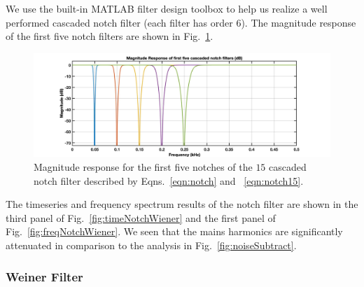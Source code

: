 \documentclass[paper-main.tex]{subfiles}
\begin{document}
We use the built-in MATLAB filter design toolbox to help us realize a well performed cascaded notch filter (each filter has order 6).  
The magnitude response of the first five notch filters are shown in Fig.~\ref{fig:notchMagResponse}. 
\begin{figure}
\begin{center}
\includegraphics[width=.49\textwidth]{figures/1111}
\end{center}
\caption{\label{fig:notchMagResponse}
Magnitude response for the first five notches of the $15$ cascaded notch filter described by Eqns.~\ref{eqn:notch} and ~\ref{eqn:notch15}. 
}
\end{figure}


The timeseries and frequency spectrum results of the notch filter are shown in the third panel of Fig.~\ref{fig:timeNotchWiener} and the first panel of Fig.~\ref{fig:freqNotchWiener}. 
We seen that the mains harmonics are significantly attenuated in comparison to the analysis in Fig.~\ref{fig:noiseSubtract}. 




\subsubsection{Weiner Filter}
\end{document}
